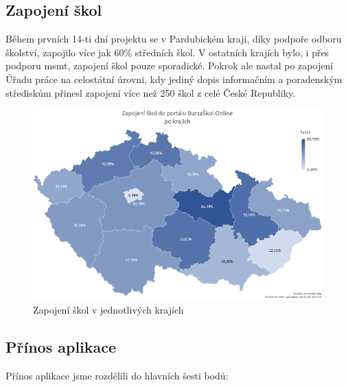\subsection{Zapojení škol}

Během prvních 14-ti dní projektu se v Pardubickém kraji, díky podpoře odboru školství, zapojilo více jak 60\% středních škol.
V ostatních krajích bylo, i přes podporu \acrshort{msmt}, zapojení škol pouze sporadické.
Pokrok ale nastal po zapojení Úřadu práce na celostátní úrovni,
kdy jediný dopis informačním a poradenským střediskům přinesl zapojení více než 250 škol z celé České Republiky.

\begin{figure}[H]
\centering
\includegraphics[width=\textwidth]{img/kraje-zapojeni.png}
\caption{Zapojení škol v jednotlivých krajích}\label{fig:kraje-zapojeni}
\end{figure}

\subsection{Přínos aplikace}

Přínos aplikace jsme rozdělili do hlavních šesti bodů:

